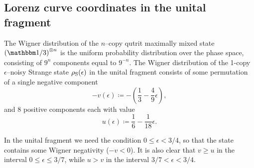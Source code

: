 \documentclass[pra,
aps,
twocolumn,
superscriptaddress,
groupedaddress,
nofootinbib,
reprint
]{revtex4-1}
\begin{document}
\subsection{Lorenz curve coordinates in the unital fragment}\label{app:lcsu_coord}

The Wigner distribution of the $n$--copy qutrit maximally mixed state $\left(\id/3\right)^{\otimes n}$ is the uniform probability distribution over the phase space, consisting of $9^n$ components equal to $9^{-n}$.
The Wigner distribution of the 1-copy $\epsilon$--noisy Strange state $\rho_{\rm{S}}(\epsilon)$ in the unital fragment consists of some permutation of a single negative component
\begin{equation}
	- v(\epsilon) \coloneqq - \left( \frac{1}{3} -\frac{4}{9}\epsilon \right),
\end{equation} 
and $8$ positive components each with value
\begin{equation}
	u(\epsilon) \coloneqq \frac{1}{6} -\frac{1}{18}\epsilon.
\end{equation}

In the unital fragment we need the condition $0 \leq \epsilon < 3/4$, so that the state contains some Wigner negativity ($-v < 0$).
It is also clear that $v \geq u$ in the interval $0 \leq \epsilon \leq 3/7$, while $u > v$ in the interval $3/7 < \epsilon < 3/4$.
\end{document}
